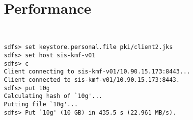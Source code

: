 \documentclass[10pt]{article}
\begin{document}
\section{Performance}

\begin{verbatim}


sdfs> set keystore.personal.file pki/client2.jks
sdfs> set host sis-kmf-v01
sdfs> c
Client connecting to sis-kmf-v01/10.90.15.173:8443...
Client connected to sis-kmf-v01/10.90.15.173:8443.
sdfs> put 10g
Calculating hash of `10g'...
Putting file `10g'...
sdfs> Put `10g' (10 GB) in 435.5 s (22.961 MB/s).



\end{verbatim}
\end{document}
